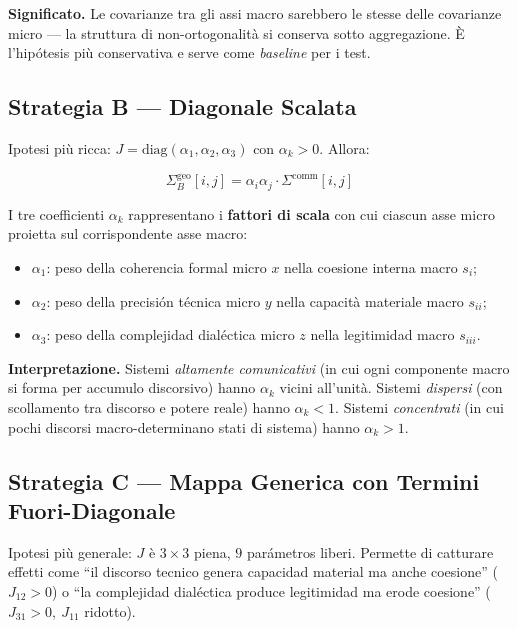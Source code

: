 \Hypoth{} \textbf{Significato.} Le covarianze tra gli assi macro
sarebbero le stesse delle covarianze micro --- la struttura di
non-ortogonalità si conserva sotto aggregazione. È l'hipótesis più
conservativa e serve come \emph{baseline} per i test.

\subsection{Strategia B --- Diagonale
Scalata}\label{strategia-b-diagonale-scalata}

Ipotesi più ricca: \(J = \text{diag}(\alpha_1, \alpha_2, \alpha_3)\) con
\(\alpha_k > 0\). Allora:

\[
\Sigma^{\text{geo}}_B[i,j] = \alpha_i \alpha_j \cdot \Sigma^{\text{comm}}[i,j]
\]

I tre coefficienti \(\alpha_k\) rappresentano i \textbf{fattori di
scala} con cui ciascun asse micro proietta sul corrispondente asse
macro:

\begin{itemize}
\tightlist
\item
  \(\alpha_1\): peso della coherencia formal micro \(x\) nella coesione
  interna macro \(s_i\);
\item
  \(\alpha_2\): peso della precisión técnica micro \(y\) nella capacità
  materiale macro \(s_{ii}\);
\item
  \(\alpha_3\): peso della complejidad dialéctica micro \(z\) nella
  legitimidad macro \(s_{iii}\).
\end{itemize}

\Hypoth{} \textbf{Interpretazione.} Sistemi \emph{altamente
comunicativi} (in cui ogni componente macro si forma per accumulo
discorsivo) hanno \(\alpha_k\) vicini all'unità. Sistemi \emph{dispersi}
(con scollamento tra discorso e potere reale) hanno \(\alpha_k < 1\).
Sistemi \emph{concentrati} (in cui pochi discorsi macro-determinano
stati di sistema) hanno \(\alpha_k > 1\).

\subsection{Strategia C --- Mappa Generica con Termini
Fuori-Diagonale}\label{strategia-c-mappa-generica-con-termini-fuori-diagonale}

Ipotesi più generale: \(J\) è \(3 \times 3\) piena, \(9\) parámetros
liberi. Permette di catturare effetti come ``il discorso tecnico genera
capacidad material ma anche coesione'' (\(J_{12} > 0\)) o ``la
complejidad dialéctica produce legitimidad ma erode coesione''
(\(J_{31} > 0,\ J_{11}\) ridotto).

